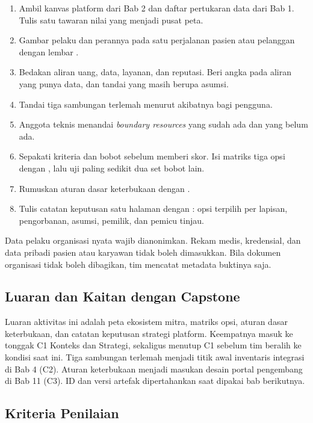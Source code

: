\begin{enumerate}
  \item Ambil kanvas platform dari Bab 2 dan daftar pertukaran data dari Bab 1. Tulis satu tawaran nilai yang
        menjadi pusat peta.
  \item Gambar pelaku dan perannya pada satu perjalanan pasien atau pelanggan dengan lembar
        .
  \item Bedakan aliran uang, data, layanan, dan reputasi. Beri angka pada aliran yang punya data, dan tandai
        yang masih berupa asumsi.
  \item Tandai tiga sambungan terlemah menurut akibatnya bagi pengguna.
  \item Anggota teknis menandai \textit{boundary resources} yang sudah ada dan yang belum ada.
  \item Sepakati kriteria dan bobot sebelum memberi skor. Isi matriks tiga opsi dengan
        , lalu uji paling sedikit dua set bobot lain.
  \item Rumuskan aturan dasar keterbukaan dengan .
  \item Tulis catatan keputusan satu halaman dengan
        : opsi terpilih per lapisan, pengorbanan,
        asumsi, pemilik, dan pemicu tinjau.
\end{enumerate}

Data pelaku organisasi nyata wajib dianonimkan. Rekam medis, kredensial, dan data pribadi pasien atau karyawan
tidak boleh dimasukkan. Bila dokumen organisasi tidak boleh dibagikan, tim mencatat metadata buktinya saja.

\subsection*{Luaran dan Kaitan dengan Capstone}

Luaran aktivitas ini adalah peta ekosistem mitra, matriks opsi, aturan dasar keterbukaan, dan catatan keputusan
strategi platform. Keempatnya masuk ke tonggak C1 Konteks dan Strategi, sekaligus menutup C1 sebelum tim beralih
ke kondisi saat ini. Tiga sambungan terlemah menjadi titik awal inventaris integrasi di Bab 4 (C2). Aturan
keterbukaan menjadi masukan desain portal pengembang di Bab 11 (C3). ID dan versi artefak dipertahankan saat
dipakai bab berikutnya.

\subsection*{Kriteria Penilaian}


